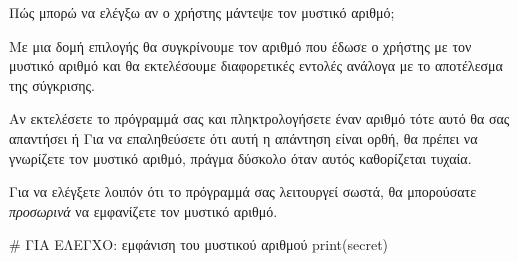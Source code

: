 \documentclass[a4paper,11pt,oneside]{book}
\begin{document}
\begin{question}
Πώς μπορώ να ελέγξω αν ο χρήστης μάντεψε τον μυστικό αριθμό;
\end{question}

Με μια δομή επιλογής θα συγκρίνουμε τον αριθμό  που έδωσε ο χρήστης με τον μυστικό αριθμό  και θα εκτελέσουμε διαφορετικές εντολές ανάλογα με το αποτέλεσμα της σύγκρισης. 




\clearpage
Αν εκτελέσετε το πρόγραμμά σας και πληκτρολογήσετε έναν αριθμό τότε αυτό θα σας απαντήσει  ή  Για να επαληθεύσετε ότι αυτή η απάντηση είναι ορθή, θα πρέπει να γνωρίζετε τον μυστικό αριθμό, πράγμα δύσκολο όταν αυτός καθορίζεται τυχαία. 

Για να ελέγξετε λοιπόν ότι το πρόγραμμά σας λειτουργεί σωστά, θα μπορούσατε \emph{προσωρινά} να εμφανίζετε τον μυστικό αριθμό.

\begin{pycode}
# ΓΙΑ ΕΛΕΓΧΟ: εμφάνιση του μυστικού αριθμού
print(secret)
\end{pycode}
\end{document}

